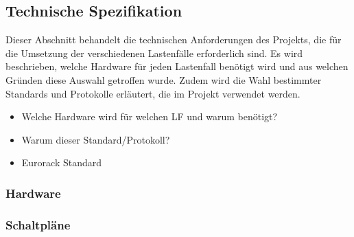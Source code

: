 \newpage
\subsection{Technische Spezifikation}
Dieser Abschnitt behandelt die technischen Anforderungen des Projekts, die für die Umsetzung der verschiedenen Lastenfälle erforderlich sind. Es wird beschrieben, welche Hardware für jeden Lastenfall benötigt wird und aus welchen Gründen diese Auswahl getroffen wurde. Zudem wird die Wahl bestimmter Standards und Protokolle erläutert, die im Projekt verwendet werden.

\begin{itemize}
	\item Welche Hardware wird für welchen LF und warum benötigt?
	\item Warum dieser Standard/Protokoll?
	\item Eurorack Standard
\end{itemize}

\subsubsection{Hardware}




\newpage
\subsubsection{Schaltpläne}


\begin{figure}[ht]
	\centering
	
	\label{fig:audio_test_schematic}
\end{figure}

\newpage
\begin{figure}[ht]
	\centering
	
	\label{fig:interface_test_schematic}
\end{figure}